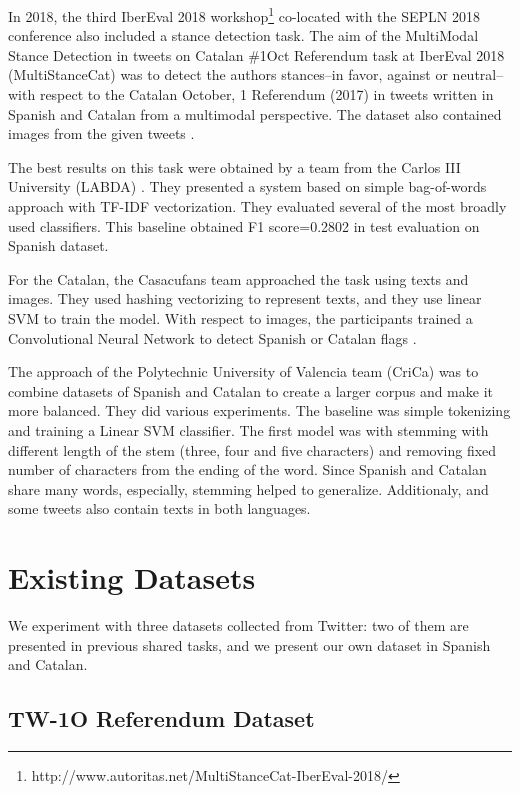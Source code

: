 \documentclass[10pt, a4paper]{article}
\begin{document}
In 2018, the third IberEval 2018 workshop\footnote{http://www.autoritas.net/MultiStanceCat-IberEval-2018/} co-located with the SEPLN 2018 conference also included a stance detection task. The aim of the MultiModal Stance Detection in tweets on Catalan \#1Oct Referendum task at IberEval 2018 (MultiStanceCat) was to detect the authors stances--in favor, against or neutral-- with respect to the Catalan October, 1 Referendum (2017) in tweets written in Spanish and Catalan from a multimodal perspective. The dataset also contained images from the given tweets \cite{taule18}.

The best results on this task were obtained by a team from the Carlos III University (LABDA) \cite{Segura-Bedmar18}. They presented a system based on simple bag-of-words approach with TF-IDF vectorization. They evaluated several of the most broadly used classifiers. This baseline obtained F1 score=0.2802 in test evaluation on Spanish dataset. 

For the Catalan, the Casacufans team approached the task using texts and images. They used hashing vectorizing to represent texts, and they use linear SVM to train the model. With respect to images, the participants trained a Convolutional Neural Network to detect Spanish or Catalan flags \cite{taule18}.

The approach of the Polytechnic University of Valencia team (CriCa) \cite{Cuquerella2018CriCaTM} was to combine datasets of Spanish and Catalan to create a larger corpus and make it more balanced. They did various experiments. The baseline was simple tokenizing and training a Linear SVM classifier. The first model was with stemming with different length of the stem (three, four and five characters) and removing fixed number of characters from the ending of the word. Since Spanish and Catalan share many words, especially, stemming helped to generalize. Additionaly, and some tweets also contain texts in both languages.

  

\section{Existing Datasets}

We experiment with three datasets collected from Twitter: two of them are presented in previous shared tasks, and we present our own dataset in Spanish and Catalan. 

\subsection{TW-1O Referendum Dataset}
\end{document}
